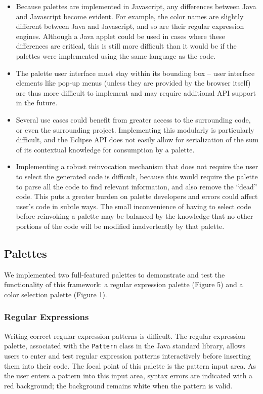 \documentclass[10pt, conference, compsocconf]{IEEEtran}
\begin{document}
\begin{itemize}
\item Because palettes are implemented in Javascript, any differences between Java and Javascript become evident. For example, the color names are slightly different between Java and Javascript, and so are their regular expression engines. Although a Java applet could be used in cases where these differences are critical, this is still more difficult than it would be if the palettes were implemented using the same language as the code.
\item The palette user interface must stay within its bounding box -- user interface elements like pop-up menus (unless they are provided by the browser itself) are thus more difficult to implement and may require additional API support in the future.
\item Several use cases could benefit from greater access to the surrounding code, or even the surrounding project. Implementing this modularly is particularly difficult, and the Eclipse API does not easily allow for  serialization of the sum of its contextual knowledge for consumption by a palette.
\item Implementing a robust reinvocation mechanism that does not require the user to select the generated code is difficult, because this would require the palette to parse all the code to find relevant information, and also remove the ``dead'' code. This puts a greater burden on palette developers and errors could affect user's code in subtle ways. The small inconvenience of having to select code before reinvoking a palette may be balanced by the knowledge that no other portions of the code will be modified inadvertently by that palette.
\end{itemize}

\subsection{Palettes}
We implemented two full-featured palettes to demonstrate and test the functionality of this framework: a regular expression palette (Figure 5) and a color selection palette (Figure 1).

\subsubsection{Regular Expressions}
Writing correct regular expression patterns is difficult. The regular expression palette, associated with the \verb|Pattern| class in the Java standard library, allows users to enter and test regular expression patterns interactively before inserting them into their code.  The focal point of this palette is the pattern input area. As the user enters a pattern into this input area, syntax errors are indicated with a red background; the background remains white when the pattern is valid.
\end{document}
